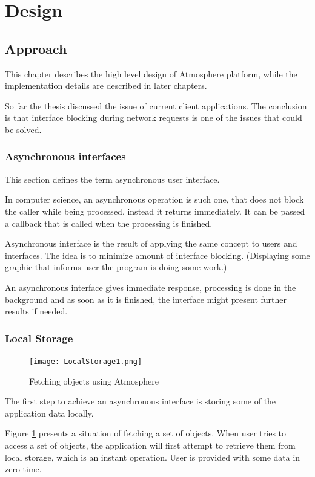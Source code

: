 \section{Design}

\subsection{Approach}

This chapter describes the high level design of Atmosphere platform, while the implementation details are described in later chapters. 

So far the thesis discussed the issue of current client applications. The conclusion is that interface blocking during network requests is one of the issues that could be solved.

\subsubsection{Asynchronous interfaces}

This section defines the term asynchronous user interface. \citep{maccaw_async}

In computer science, an asynchronous operation is such one, that does not block the caller while being processed, instead it returns immediately. It can be passed a callback that is called when the processing is finished.

Asynchronous interface is the result of applying the same concept to users and interfaces. The idea is to minimize amount of interface blocking. (Displaying some graphic that informs user the program is doing some work.)

An asynchronous interface gives immediate response, processing is done in the background and as soon as it is finished, the interface might present further results if needed.

\subsubsection{Local Storage}

\begin{figure}[ht!]
\centering
\texttt{[image: LocalStorage1.png]}
\caption{Fetching objects using Atmosphere \label{fig:1}}
\end{figure}

The first step to achieve an asynchronous interface is storing some of the application data locally.

Figure \ref{fig:1} presents a situation of fetching a set of objects. When user tries to access a set of objects,  the application will first attempt to retrieve them from local storage,  which is an instant operation. User is provided with some data in zero time.

